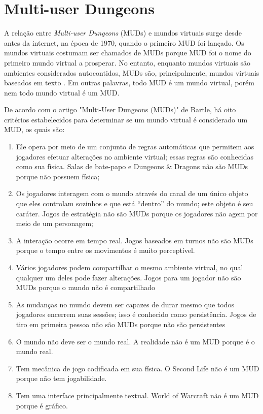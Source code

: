 \section{Multi-user Dungeons}



A relação entre \textit{Multi-user Dungeons} (MUDs) e mundos virtuais surge desde antes da internet, 
na época de 1970, quando o primeiro MUD foi lançado. Os mundos virtuais costumam ser chamados de MUDs 
porque MUD foi o nome do primeiro mundo virtual a prosperar. No entanto, enquanto mundos virtuais são 
ambientes considerados autocontidos, MUDs são, principalmente, mundos virtuais baseados em texto \cite{bartle2004designing,bartle2015multi}. 
Em outras palavras, todo MUD é um mundo virtual, porém nem todo mundo virtual é um MUD.

De acordo com o artigo "Multi-User Dungeons (MUDs)" de Bartle, há oito critérios estabelecidos para 
determinar se um mundo virtual é considerado um MUD, os quais são:

\begin{enumerate}
    \item Ele opera por meio de um conjunto de regras automáticas que permitem aos jogadores efetuar 
    alterações no ambiente virtual; essas regras são conhecidas como sua física. Salas de bate-papo e 
    Dungeons \& Dragons não são MUDs porque não possuem física;
    \item Os jogadores interagem com o mundo através do canal de um único objeto que eles controlam 
    sozinhos e que está “dentro” do mundo; este objeto é seu caráter. Jogos de estratégia não são MUDs 
    porque os jogadores não agem por meio de um personagem;
    \item A interação ocorre em tempo real. Jogos baseados em turnos não são MUDs porque o tempo entre 
    os movimentos é muito perceptível.
    \item Vários jogadores podem compartilhar o mesmo ambiente virtual, no qual qualquer um deles pode 
    fazer alterações. Jogos para um jogador não são MUDs porque o mundo não é compartilhado
    \item As mudanças no mundo devem ser capazes de durar mesmo que todos jogadores encerrem suas 
    sessões; isso é conhecido como persistência. Jogos de tiro em primeira pessoa não são MUDs porque 
    não são persistentes
    \item O mundo não deve ser o mundo real. A realidade não é um MUD porque é o mundo real.
    \item Tem mecânica de jogo codificada em sua física. O Second Life não é um MUD porque não tem jogabilidade.
    \item Tem uma interface principalmente textual. World of Warcraft não é um MUD porque é gráfico.
\end{enumerate}

